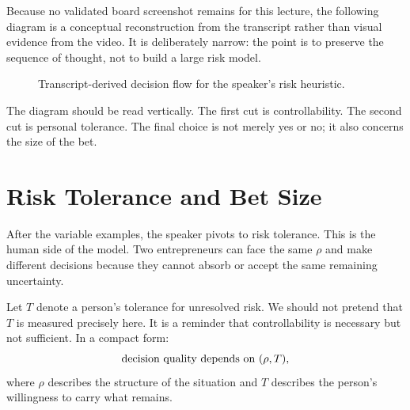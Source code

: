 Because no validated board screenshot remains for this lecture, the following diagram is a conceptual reconstruction from the transcript rather than visual evidence from the video. It is deliberately narrow: the point is to preserve the sequence of thought, not to build a large risk model.

\begin{figure}
\centering
{}
\caption{Transcript-derived decision flow for the speaker's risk heuristic.}
\end{figure}

The diagram should be read vertically. The first cut is controllability. The second cut is personal tolerance. The final choice is not merely yes or no; it also concerns the size of the bet.

\section{Risk Tolerance and Bet Size}

After the variable examples, the speaker pivots to risk tolerance. This is the human side of the model. Two entrepreneurs can face the same \(\rho\) and make different decisions because they cannot absorb or accept the same remaining uncertainty.

Let \(T\) denote a person's tolerance for unresolved risk. We should not pretend that \(T\) is measured precisely here. It is a reminder that controllability is necessary but not sufficient. In a compact form:
\begin{equation}
\hbox{decision quality depends on }(\rho,T),
\end{equation}
where \(\rho\) describes the structure of the situation and \(T\) describes the person's willingness to carry what remains.

